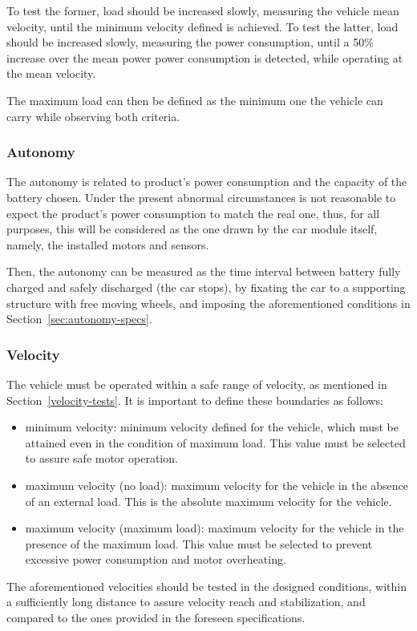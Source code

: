 To test the former, load should be increased slowly, measuring the vehicle
mean velocity, until the minimum velocity defined is achieved. To test the
latter, load should be increased slowly, measuring the power consumption, until
a 50\% increase over the mean power power consumption is detected, while
operating at the mean velocity.

The maximum load can then be defined as the minimum one the vehicle can carry
while observing both criteria.

\subsubsection{Autonomy}%
\label{sec:org532616f}
The autonomy is related to product's power consumption and the capacity of the
battery chosen. Under the present abnormal circumstances is not reasonable to
expect the product's power consumption to match the real one, thus, for all
purposes, this will be considered as the one drawn by the car module itself,
namely, the installed motors and sensors.

Then, the autonomy can be measured as the time interval between battery fully
charged and safely discharged (the car stops), by fixating the car to a
supporting structure with free moving wheels, and imposing the aforementioned
conditions in Section~\ref{sec:autonomy-specs}.

\subsubsection{Velocity}%
\label{sec:org20789b4}
The vehicle must be operated within a safe range of velocity, as mentioned in
Section~\ref{velocity-tests}. It is important to define these boundaries as follows:
\begin{itemize}
\item minimum velocity: minimum velocity defined for the vehicle, which must be
  attained even in the condition of maximum load. This value must be selected to
  assure safe motor operation.
\item maximum velocity (no load): maximum velocity for the vehicle in the
  absence of an external load. This is the absolute maximum velocity for the
  vehicle.
\item maximum velocity (maximum load): maximum velocity for the vehicle in the
  presence of the maximum load. This value must be selected to prevent excessive
  power consumption and motor overheating.
\end{itemize}
The aforementioned velocities should be tested in the designed conditions,
within a sufficiently long distance to assure velocity reach and stabilization,
and compared to the ones provided in the foreseen specifications.

